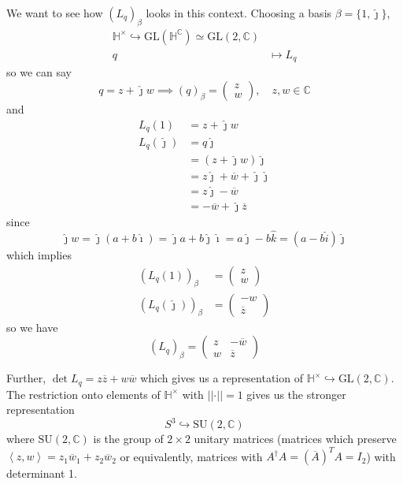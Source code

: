 \documentclass[12pt]{article}
\renewcommand{\hat}[1]{\widehat{#1}}
\newcommand{\C}{\mathbb{C}}
\renewcommand{\H}{\mathbb{H}}
\newcommand{\brak}[1]{\left\langle #1 \right\rangle}
\newcommand{\norm}[1]{\left\vert \left\vert #1 \right\vert \right\vert}
\newcommand{\GL}{\text{GL}}
\newcommand{\SU}{\text{SU}}
\newcommand{\ihat}{\hat{\imath}}
\newcommand{\jhat}{\hat{\jmath}}
\renewcommand{\bar}{\overline}
\begin{document}
    We want to see how $(L_q)_{\beta}$ looks in this context. Choosing a basis $\beta = \{1, \jhat\}$, 
    \[\begin{aligned}
        \H^{\times} \hookrightarrow \GL(\H^{\C}) \simeq \GL(2, \C)\\
        q &\mapsto L_q
    \end{aligned}\]
    so we can say 
    \[q = z + \jhat w \implies (q)_{\beta} = \begin{pmatrix}
        z \\ w
    \end{pmatrix}, \quad z, w \in \C\] 
    and 
    \begin{align*}
        L_q(1) &= z + \jhat w\\
        L_q(\jhat) &= q\jhat\\ 
            &= (z + \jhat w)\jhat\\ 
            &= z\jhat + \bar w + \jhat \jhat\\ 
            &= z \jhat - \bar w\\ 
            &= -\bar w + \jhat \bar z
    \end{align*}
    since 
    \[\jhat w = \jhat(a + b\ihat) = \jhat a + b\jhat \ihat = a\jhat - b \hat k = (a - b\hat i)\jhat\]
    which implies 
    \begin{align*}
        (L_q(1))_{\beta} &= \begin{pmatrix}
            z\\w
        \end{pmatrix}\\ 
        (L_q(\jhat))_{\beta} &= \begin{pmatrix}
            -w\\\bar z
        \end{pmatrix}
    \end{align*}
    so we have 
    \[(L_q)_{\beta} = \begin{pmatrix}
        z & -\bar w\\ 
        w & \bar z
    \end{pmatrix}\]

    Further, $\det L_q = z\bar z + w\bar w$ which gives us a representation of $\H^{\times} \hookrightarrow \GL(2, \C)$. The restriction onto elements of $\H^{\times}$ with $\norm{\cdot} = 1$ gives us the stronger representation 
    \[S^3 \hookrightarrow \SU(2, \C)\] 
    where $\SU(2, \C)$ is the group of $2 \times 2$ unitary matrices (matrices which preserve $\brak{z, w} = z_1 \bar w_1 + z_2 \bar w_2$ or equivalently, matrices with $A^{\dagger}A = (\bar A)^TA = I_2$) with determinant 1.
\end{document}

